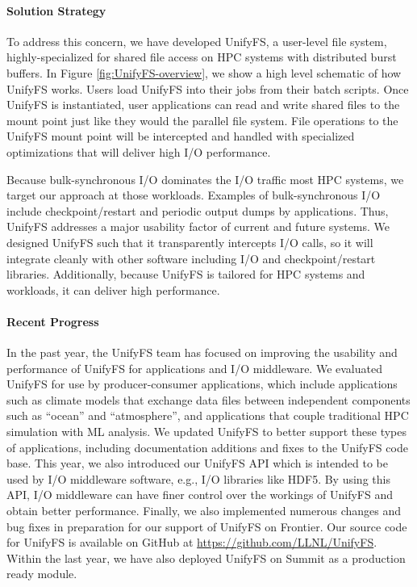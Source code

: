 \paragraph{Solution Strategy}

To address this concern, we have developed UnifyFS, a user-level file system,
highly-specialized for shared file access on HPC systems with distributed
burst buffers. In Figure \ref{fig:UnifyFS-overview}, we show a high
level schematic of how UnifyFS works. Users load UnifyFS into
their jobs from their batch scripts. Once UnifyFS is instantiated, user
applications can read and write shared files to the mount point just like
they would the parallel file system. File operations to the UnifyFS
mount point will be intercepted and handled with specialized optimizations
that will deliver high I/O performance.

Because bulk-synchronous I/O dominates the
I/O traffic most HPC systems, we target our approach at
those workloads. Examples of bulk-synchronous I/O include checkpoint/restart
and periodic output dumps by applications. Thus, UnifyFS  addresses a major usability
factor of current and future systems. We designed UnifyFS such
that it transparently intercepts I/O calls, so it will integrate
cleanly with other software including I/O and checkpoint/restart libraries.
Additionally, because UnifyFS is tailored for HPC systems and workloads,
it can deliver high performance.



\paragraph{Recent Progress}

In the past year, the UnifyFS team has focused on improving the usability
and performance of UnifyFS for applications and I/O middleware.
We evaluated UnifyFS for use by producer-consumer applications, which include
applications such as climate models that exchange data files between independent
components such as ``ocean'' and ``atmosphere'', and applications that couple
traditional HPC simulation with ML analysis. We updated UnifyFS to better support
these types of applications, including documentation additions and fixes to the
UnifyFS code base. This year, we also introduced our UnifyFS API which is intended
to be used by I/O middleware software, e.g., I/O libraries like HDF5. By using this
API, I/O middleware can have finer control over the workings of UnifyFS and obtain
better performance. Finally, we also implemented numerous changes and bug fixes
in preparation for our support of UnifyFS on Frontier.
Our source code for UnifyFS is available on
GitHub at \url{https://github.com/LLNL/UnifyFS}. Within the last year, we have also deployed UnifyFS on Summit as a production ready module.

